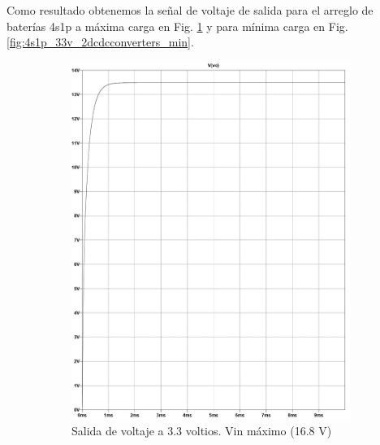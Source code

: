 Como resultado obtenemos la señal de voltaje de salida para el arreglo de baterías 4s1p a máxima carga en Fig. \ref{fig:4s1p_33v_2dcdcconverters_Max} y para mínima carga en Fig. \ref{fig:4s1p_33v_2dcdcconverters_min}.

\begin{figure}[h]
  \centering
  \begin{subfigure}{0.48\linewidth}
    \includegraphics[width=\textwidth]{Pictures/Convertidor DC-DC MC34063A, bus 3.3 v a 750 mA_page-0001.jpg}
    \caption{Salida de voltaje a 3.3 voltios. Vin máximo (16.8 V)}
    \label{fig:4s1p_33v_2dcdcconverters_Max}
  \end{subfigure}
  \hfill
  \begin{subfigure}{0.48\linewidth}

\end{subfigure}
\end{figure}
